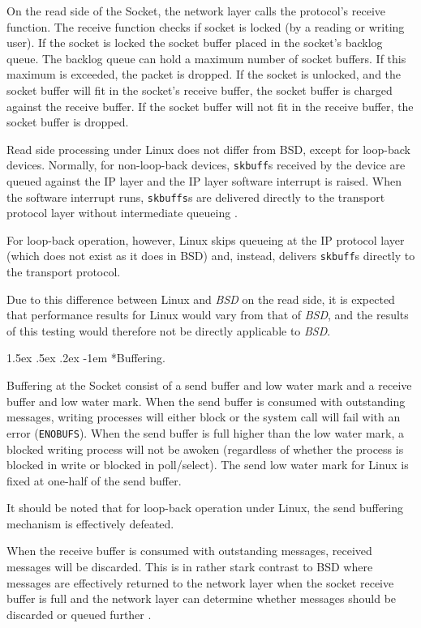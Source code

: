 \documentclass[letterpaper,final,notitlepage,twocolumn,10pt,twoside]{article}
\makeatletter
\let\normalsize = \small
\let\small = \footnotesize
\let\footnotesize = \scriptsize
\let\scriptsize = \tiny
\renewcommand\paragraph{\@startsection{paragraph}{4}{\z@}%
                                    {1.5ex \@plus .5ex \@minus .2ex}%
                                    {-1em}%
                                    {\normalfont\normalsize\bfseries\slshape}}
\makeatother
\begin{document}
On the read side of the Socket, the network layer calls the protocol's receive function.  The
receive function checks if socket is locked (by a reading or writing user).  If the socket is locked
the socket buffer placed in the socket's backlog queue.  The backlog queue can hold a maximum number
of socket buffers.  If this maximum is exceeded, the packet is dropped.  If the socket is unlocked,
and the socket buffer will fit in the socket's receive buffer, the socket buffer is charged against
the receive buffer.  If the socket buffer will not fit in the receive buffer, the socket buffer is
dropped.

Read side processing under Linux does not differ from BSD, except for loop-back devices.  Normally,
for non-loop-back devices, \texttt{skbuff}s received by the device are queued against the IP layer
and the IP layer software interrupt is raised.  When the software interrupt runs, \texttt{skbuffs}s
are delivered directly to the transport protocol layer without intermediate queueing \cite[]{bsd}.

For loop-back operation, however, Linux skips queueing at the IP protocol layer (which does not
exist as it does in BSD) and, instead, delivers \texttt{skbuff}s directly to the transport protocol.

Due to this difference between Linux and \textsl{BSD} on the read side, it is expected that
performance results for Linux would vary from that of \textsl{BSD}, and the results of this testing
would therefore not be directly applicable to \textsl{BSD}.

\paragraph*{Buffering.}

Buffering at the Socket consist of a send buffer and low water mark and a receive buffer and low
water mark.  When the send buffer is consumed with outstanding messages, writing processes will
either block or the system call will fail with an error (\texttt{ENOBUFS}).   When the send buffer
is full higher than the low water mark, a blocked writing process will not be awoken (regardless of
whether the process is blocked in write or blocked in poll/select).  The send low water mark for
Linux is fixed at one-half of the send buffer.

It should be noted that for loop-back operation under Linux, the send buffering mechanism is
effectively defeated.

When the receive buffer is consumed with outstanding messages, received messages will be discarded.
This is in rather stark contrast to BSD where messages are effectively returned to the network layer
when the socket receive buffer is full and the network layer can determine whether messages should
be discarded or queued further \cite[]{bsd}.
\end{document}
